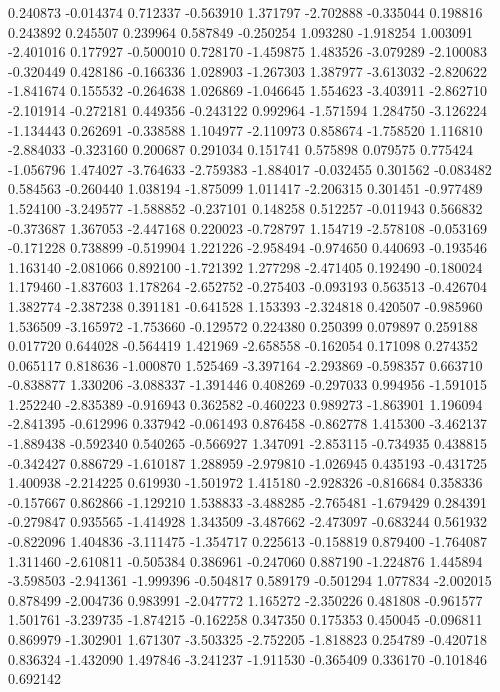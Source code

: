 0.240873
-0.014374
0.712337
-0.563910
1.371797
-2.702888
-0.335044
0.198816
0.243892
0.245507
0.239964
0.587849
-0.250254
1.093280
-1.918254
1.003091
-2.401016
0.177927
-0.500010
0.728170
-1.459875
1.483526
-3.079289
-2.100083
-0.320449
0.428186
-0.166336
1.028903
-1.267303
1.387977
-3.613032
-2.820622
-1.841674
0.155532
-0.264638
1.026869
-1.046645
1.554623
-3.403911
-2.862710
-2.101914
-0.272181
0.449356
-0.243122
0.992964
-1.571594
1.284750
-3.126224
-1.134443
0.262691
-0.338588
1.104977
-2.110973
0.858674
-1.758520
1.116810
-2.884033
-0.323160
0.200687
0.291034
0.151741
0.575898
0.079575
0.775424
-1.056796
1.474027
-3.764633
-2.759383
-1.884017
-0.032455
0.301562
-0.083482
0.584563
-0.260440
1.038194
-1.875099
1.011417
-2.206315
0.301451
-0.977489
1.524100
-3.249577
-1.588852
-0.237101
0.148258
0.512257
-0.011943
0.566832
-0.373687
1.367053
-2.447168
0.220023
-0.728797
1.154719
-2.578108
-0.053169
-0.171228
0.738899
-0.519904
1.221226
-2.958494
-0.974650
0.440693
-0.193546
1.163140
-2.081066
0.892100
-1.721392
1.277298
-2.471405
0.192490
-0.180024
1.179460
-1.837603
1.178264
-2.652752
-0.275403
-0.093193
0.563513
-0.426704
1.382774
-2.387238
0.391181
-0.641528
1.153393
-2.324818
0.420507
-0.985960
1.536509
-3.165972
-1.753660
-0.129572
0.224380
0.250399
0.079897
0.259188
0.017720
0.644028
-0.564419
1.421969
-2.658558
-0.162054
0.171098
0.274352
0.065117
0.818636
-1.000870
1.525469
-3.397164
-2.293869
-0.598357
0.663710
-0.838877
1.330206
-3.088337
-1.391446
0.408269
-0.297033
0.994956
-1.591015
1.252240
-2.835389
-0.916943
0.362582
-0.460223
0.989273
-1.863901
1.196094
-2.841395
-0.612996
0.337942
-0.061493
0.876458
-0.862778
1.415300
-3.462137
-1.889438
-0.592340
0.540265
-0.566927
1.347091
-2.853115
-0.734935
0.438815
-0.342427
0.886729
-1.610187
1.288959
-2.979810
-1.026945
0.435193
-0.431725
1.400938
-2.214225
0.619930
-1.501972
1.415180
-2.928326
-0.816684
0.358336
-0.157667
0.862866
-1.129210
1.538833
-3.488285
-2.765481
-1.679429
0.284391
-0.279847
0.935565
-1.414928
1.343509
-3.487662
-2.473097
-0.683244
0.561932
-0.822096
1.404836
-3.111475
-1.354717
0.225613
-0.158819
0.879400
-1.764087
1.311460
-2.610811
-0.505384
0.386961
-0.247060
0.887190
-1.224876
1.445894
-3.598503
-2.941361
-1.999396
-0.504817
0.589179
-0.501294
1.077834
-2.002015
0.878499
-2.004736
0.983991
-2.047772
1.165272
-2.350226
0.481808
-0.961577
1.501761
-3.239735
-1.874215
-0.162258
0.347350
0.175353
0.450045
-0.096811
0.869979
-1.302901
1.671307
-3.503325
-2.752205
-1.818823
0.254789
-0.420718
0.836324
-1.432090
1.497846
-3.241237
-1.911530
-0.365409
0.336170
-0.101846
0.692142
